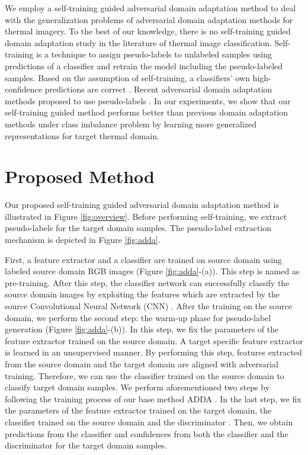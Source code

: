 \documentclass[final]{cvpr}
\begin{document}
We employ a self-training guided adversarial domain adaptation method to deal with the generalization problems of adversarial domain adaptation methods for thermal imagery. To the best of our knowledge, there is no self-training guided domain adaptation study in the literature of thermal image classification. Self-training is a technique to assign pseudo-labels to unlabeled samples using predictions of a classifier and retrain the model including the pseudo-labeled samples. Based on the assumption of self-training, a classifiers' own high-confidence predictions are correct \cite{zhu2005semi}. Recent adversarial domain adaptation methods proposed to use pseudo-labels \cite{saito2017asymmetric, xie2018learning, zhang2018collaborative}. In our experiments, we show that our self-training guided method performs better than previous domain adaptation methods under class imbalance problem by learning more generalized representations for target thermal domain.

\section{Proposed Method}
\label{sec:method}

Our proposed self-training guided adversarial domain adaptation method is illustrated in Figure \ref{fig:overview}. Before performing self-training, we extract pseudo-labels for the target domain samples. The pseudo-label extraction mechanism is depicted in Figure \ref{fig:adda}. 

First, a feature extractor  and a classifier  are trained on source domain using labeled source domain RGB images (Figure \ref{fig:adda}-(a)). This step is named as pre-training. After this step, the classifier network  can successfully classify the source domain images by exploiting the features which are extracted by the source Convolutional Neural Network (CNN) . After the training on the source domain, we perform the second step: the warm-up phase for pseudo-label generation (Figure \ref{fig:adda}-(b)). In this step, we fix the parameters of the feature extractor  trained on the source domain. A target specific feature extractor  is learned in an unsupervised manner. By performing this step, features extracted from the source domain and the target domain are aligned with adversarial training. Therefore, we can use the classifier  trained on the source domain to classify target domain samples. We perform aforementioned two steps by following the training process of our base method ADDA \cite{adda}. In the last step, we fix the parameters of the feature extractor  trained on the target domain, the classifier  trained on the source domain and the discriminator . Then, we obtain predictions from the classifier and confidences from both the classifier and the discriminator for the target domain samples.
\end{document}
